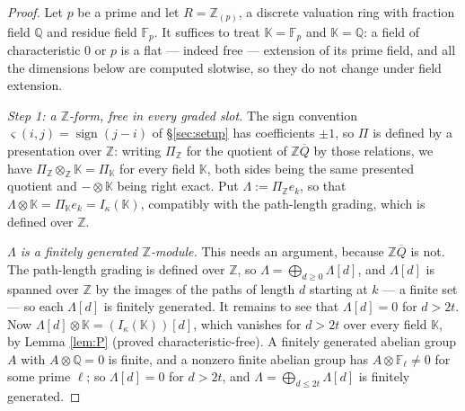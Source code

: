 \documentclass[reqno]{amsart}
\theoremstyle{plain}
\theoremstyle{definition}
\newcommand{\ka}{\kappa}
\newcommand{\Pia}{\Pi}
\begin{document}
\begin{proof}
Let $p$ be a prime and let $R=\mathbb{Z}_{(p)}$, a discrete valuation ring with
fraction field $\mathbb{Q}$ and residue field $\mathbb{F}_p$.  It suffices to
treat $\mathbb{K}=\mathbb{F}_p$ and $\mathbb{K}=\mathbb{Q}$: a field of
characteristic $0$ or $p$ is a flat --- indeed free --- extension of its prime
field, and all the dimensions below are computed slotwise, so they do not
change under field extension.

\smallskip\noindent
\emph{Step 1: a $\mathbb{Z}$-form, free in every graded slot.}  The sign
convention $\varsigma(i,j)=\operatorname{sign}(j-i)$ of \S\ref{sec:setup} has
coefficients $\pm1$, so $\Pia$ is defined by a presentation over $\mathbb{Z}$:
writing $\Pia_{\mathbb{Z}}$ for the quotient of $\mathbb{Z}\overline{Q}$ by
those relations, we have $\Pia_{\mathbb{Z}}\otimes_{\mathbb{Z}}\mathbb{K}
=\Pia_{\mathbb{K}}$ for every field $\mathbb{K}$, both sides being the same
presented quotient and $-\otimes\mathbb{K}$ being right exact.  Put
$\Lambda:=\Pia_{\mathbb{Z}}e_k$, so that
$\Lambda\otimes\mathbb{K}=\Pia_{\mathbb{K}}e_k=I_\ka(\mathbb{K})$, compatibly
with the path-length grading, which is defined over $\mathbb{Z}$.

\emph{$\Lambda$ is a finitely generated $\mathbb{Z}$-module.}  This needs an
argument, because $\mathbb{Z}\overline{Q}$ is not.  The path-length grading is
defined over $\mathbb{Z}$, so $\Lambda=\bigoplus_{d\ge0}\Lambda[d]$, and
$\Lambda[d]$ is spanned over $\mathbb{Z}$ by the images of the paths of length
$d$ starting at $k$ --- a finite set --- so each $\Lambda[d]$ is finitely
generated.  It remains to see that $\Lambda[d]=0$ for $d>2t$.  Now
$\Lambda[d]\otimes\mathbb{K}=(I_\ka(\mathbb{K}))[d]$, which vanishes for
$d>2t$ over every field $\mathbb{K}$, by Lemma \ref{lem:P} (proved
characteristic-free).  A finitely generated abelian group $A$ with
$A\otimes\mathbb{Q}=0$ is finite, and a nonzero finite abelian group has
$A\otimes\mathbb{F}_\ell\ne0$ for some prime $\ell$; so $\Lambda[d]=0$ for
$d>2t$, and $\Lambda=\bigoplus_{d\le2t}\Lambda[d]$ is finitely generated.


\end{proof}
\end{document}
